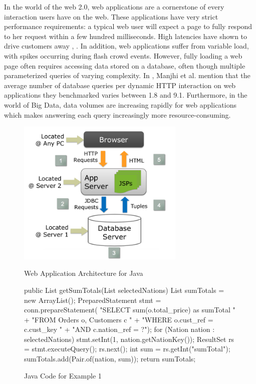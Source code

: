 In the world of the web 2.0, web applications are a cornerstone of every interaction users have on the web. These applications have very strict performance requirements: a typical web user will expect a page to fully respond to her request within a few hundred milliseconds. High latencies have shown to drive customers away \cite{akamai}, \cite{akamai2}. In addition, web applications suffer from variable load, with spikes occurring during flash crowd events. However, fully loading a web page often requires accessing data stored on a database, often though multiple parameterized queries of varying complexity. In \cite{manjhi2009}, Manjhi et al. mention that the average number of database queries per dynamic HTTP interaction on web applications they benchmarked varies between 1.8 and 9.1. Furthermore, in the world of Big Data, data volumes are increasing rapidly for web applications which makes answering each query increasingly more resource-consuming.

\begin{figure}[h]
\centering
\begin{minipage}{0.45\textwidth}
\includegraphics[width=8cm]{images/WebApplicationArchitecture.png}
\caption{Web Application Architecture for Java}
\label{fig:webapp}
\end{minipage} \hfill
\begin{minipage}{0.45\textwidth}
\centering
\begin{Java}[basicstyle=\small]
public List getSumTotals(List selectedNations) {
     List sumTotals = new ArrayList();
     PreparedStatement stmt = conn.prepareStatement(
        "SELECT sum(o.total_price) as sumTotal "
        + "FROM Orders o, Customers c "
        + "WHERE o.cust_ref = c.cust_key "
        + "AND c.nation_ref = ?");
     for (Nation nation : selectedNations) {
         stmt.setInt(1, nation.getNationKey());
         ResultSet rs = stmt.executeQuery();
         rs.next();
         int sum = rs.getInt("sumTotal");
         sumTotals.add(Pair.of(nation, sum));
     }
     return sumTotals;
}
\end{Java}
\caption{Java Code for Example 1}
\label{fig:code1}
\end{minipage} \hfill
\end{figure}


